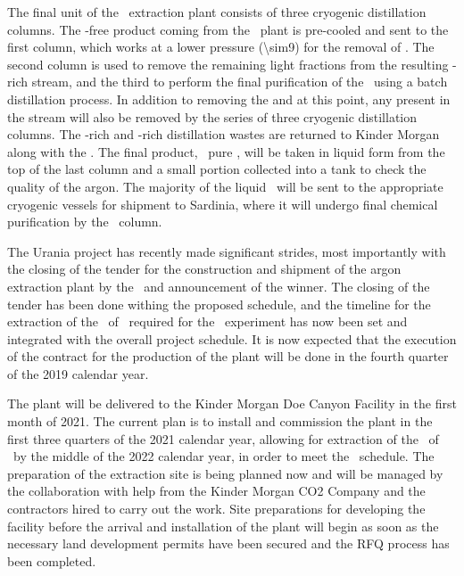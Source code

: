 The final unit of the \UAr\ extraction plant consists of three cryogenic distillation columns.  The -free product coming from the \PSA\ plant is pre-cooled and sent to the first column, which works at a lower pressure (\SI{\sim9}{\barg}) for the removal of .  The second column is used to remove the remaining light fractions from the resulting -rich stream, and the third to perform the final purification of the \UAr\ using a batch distillation process.  In addition to removing the  and  at this point, any  present in the stream will also be removed by the series of three cryogenic distillation columns.  The -rich and -rich distillation wastes are returned to Kinder Morgan along with the .  The final product, \UraniaArFinalPurity\ pure \UAr, will be taken in liquid form from the top of the last column and a small portion collected into a tank to check the quality of the argon.  The majority of the liquid \UAr\ will be sent to the appropriate cryogenic vessels for shipment to Sardinia, where it will undergo final chemical purification by the \SeruciOne\ column.

The Urania project has recently made significant strides, most importantly with the closing of the tender for the construction and shipment of the argon extraction plant by the \INFN\ and announcement of the winner.  The closing of the tender has been done withing the proposed schedule, and the timeline for the extraction of the \UraniaTotalDSkProduction\ of \UAr\ required for the \DSks\ experiment has now been set and integrated with the overall project schedule.  It is now expected that the execution of the contract for the production of the plant will be done in the fourth quarter of the 2019 calendar year.  

The plant will be delivered to the Kinder Morgan Doe Canyon Facility in the first month of 2021. The current plan is to install and commission the plant in the first three quarters of the 2021 calendar year, allowing for extraction of the \UraniaTotalDSkProduction\ of \UAr\ by the middle of the 2022 calendar year, in order to meet the \DSk\ schedule. The preparation of the extraction site is being planned now and will be managed by the collaboration with help from the Kinder Morgan CO2 Company and the contractors hired to carry out the work. Site preparations for developing the facility before the arrival and installation of the plant will begin as soon as the necessary land development permits have been secured and the RFQ process has been completed. 

